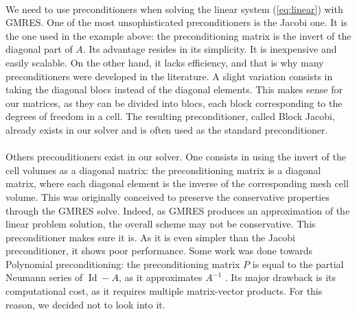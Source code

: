       \paragraph{}
      We need to use preconditioners when solving the linear system (\ref{eq:linear}) with GMRES.
      One of the most unsophisticated preconditioners is the Jacobi one.
      It is the one used in the example above: the preconditioning matrix is the invert of the diagonal part of $A$.
      Its advantage resides in its simplicity.
      It is inexpensive and easily scalable.
      On the other hand, it lacks efficiency, and that is why many preconditioners were developed in the literature.
      A slight variation consists in taking the diagonal blocs instead of the diagonal elements.
      This makes sense for our matrices, as they can be divided into blocs, each block corresponding to the degrees of freedom in a cell.
      The resulting preconditioner, called Block Jacobi, already exists in our solver and is often used as the standard preconditioner.

      \paragraph{}
      Others preconditioners exist in our solver.
      One consists in using the invert of the cell volumes as a diagonal matrix: the preconditioning matrix is a diagonal matrix, where each diagonal element is the inverse of the corresponding mesh cell volume.
      This was originally conceived to preserve the conservative properties through the GMRES solve.
      Indeed, as GMRES produces an approximation of the linear problem solution, the overall scheme may not be conservative.
      This preconditioner makes sure it is.
      As it is even simpler than the Jacobi preconditioner, it shows poor performance.
      Some work was done towards Polynomial preconditioning: the preconditioning matrix $P$ is equal to the partial Neumann series of $\operatorname{Id} - A$, as it approximates $A^{-1}$ \cite{DuboisGreenbaumRodrigue1979}.
      Its major drawback is its computational cost, as it requires multiple matrix-vector products.
      For this reason, we decided not to look into it.

